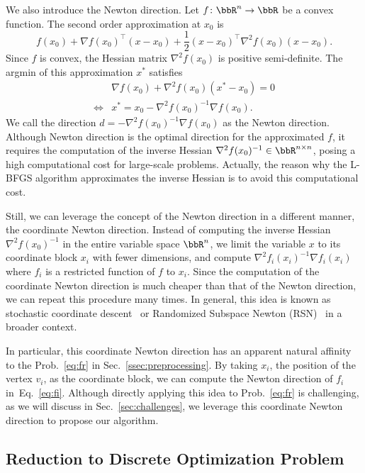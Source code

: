 \documentclass[dvipdfmx,10pt,journal,compsoc]{IEEEtran}
\begin{document}
We also introduce the Newton direction.
Let $f\colon \bbR^n \to \bbR$ be a convex function.
The second order approximation at $x_0$ is
\begin{equation*}
  f(x_0) + \nabla f(x_0)^\top (x - x_0) + \frac{1}{2} (x - x_0)^\top \nabla^2 f(x_0) (x - x_0).
\end{equation*}
Since $f$ is convex, the Hessian matrix $\nabla^2 f(x_0)$ is positive semi-definite.
The argmin of this approximation $x^*$ satisfies
\begin{align*}
       & \nabla f(x_0) + \nabla^2 f(x_0) (x^* - x_0) = 0 \\
  \iff & x^* = x_0 - \nabla^2 f(x_0)^{-1} \nabla f(x_0).
\end{align*}
We call the direction $d = -\nabla^2 f(x_0)^{-1} \nabla f(x_0)$ as the Newton direction.
Although Newton direction is the optimal direction for the approximated $f$, it requires the computation of the inverse Hessian $\nabla^2 f(x_0)^{-1} \in \bbR^{n \times n}$, posing a high computational cost for large-scale problems. Actually, the reason why the L-BFGS algorithm approximates the inverse Hessian is to avoid this computational cost.

Still, we can leverage the concept of the Newton direction in a different manner, the coordinate Newton direction.
Instead of computing the inverse Hessian $\nabla^2 f(x_0)^{-1}$ in the entire variable space $\bbR^n$, we limit the variable $x$ to its coordinate block $x_i$ with fewer dimensions, and compute $\nabla^2 f_i(x_i)^{-1} \nabla f_i(x_i)$ where $f_i$ is a restricted function of $f$ to $x_i$.
Since the computation of the coordinate Newton direction is much cheaper than that of the Newton direction, we can repeat this procedure many times.
In general, this idea is known as stochastic coordinate descent~\cite{recht-wright} or Randomized Subspace Newton (RSN)~\cite{NEURIPS2019_bc6dc48b} in a broader context.

In particular, this coordinate Newton direction has an apparent natural affinity to the Prob.~\eqref{eq:fr} in Sec.~\ref{ssec:preprocessing}.
By taking $x_i$, the position of the vertex $v_i$, as the coordinate block, we can compute the Newton direction of $f_i$ in~Eq.~\eqref{eq:fi}.
Although directly applying this idea to Prob.~\eqref{eq:fr} is challenging, as we will discuss in Sec.~\ref{sec:challenges}, we leverage this coordinate Newton direction to propose our algorithm.

\subsection{Reduction to Discrete Optimization Problem}\label{ssec:reduction}
\end{document}

